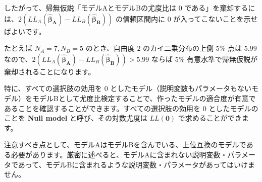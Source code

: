 したがって、帰無仮説「モデルAとモデルBの尤度比は $0$ である」を棄却するには、$2(LL_A(\bm{\hat\beta_A})-LL_B(\bm{\hat\beta_B}))$ の信頼区間内に $0$ が入ってこないことを示せばよいです。

たとえば $N_A=7, N_B=5$ のとき、自由度 $2$ のカイ二乗分布の上側 $5\%$ 点は $5.99$ なので、$2(LL_A(\bm{\hat\beta_A})-LL_B(\bm{\hat\beta_B}))>5.99$ ならば $5\%$ 有意水準で帰無仮説が棄却されることになります。

特に、すべての選択肢の効用を $0$ としたモデル（説明変数もパラメータもないモデル）をモデルBとして尤度比検定することで、作ったモデルの適合度が有意であることを確認することができます。すべての選択肢の効用を $0$ としたモデルのことを \textbf{Null model} と呼び、その対数尤度は $LL(\bm 0)$ で求めることができます。

注意すべき点として、モデルAはモデルBを含んでいる、上位互換のモデルである必要があります。厳密に述べると、モデルAに含まれない説明変数・パラメータであって、モデルBに含まれるような説明変数・パラメータがあってはいけません。
